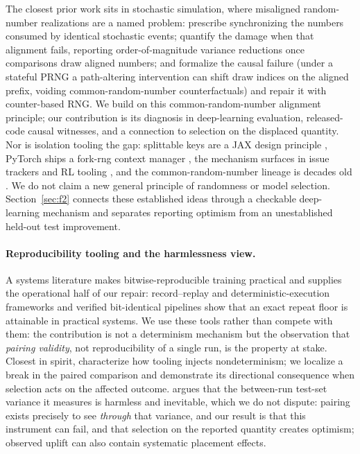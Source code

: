 The closest prior work sits in stochastic simulation, where misaligned
random-number realizations are a named problem: \citet{stout2008keeping}
prescribe synchronizing the numbers consumed by identical stochastic events;
\citet{klein2024noisefree} quantify the damage when that alignment fails,
reporting order-of-magnitude variance reductions once comparisons draw aligned
numbers; and \citet{buffalo2026realizing} formalize the causal failure (under a
stateful PRNG a path-altering intervention can shift draw indices on the aligned prefix,
voiding common-random-number counterfactuals) and repair it with counter-based
RNG. We build on this common-random-number alignment principle; our
contribution is its diagnosis in deep-learning evaluation, released-code
causal witnesses, and a connection to selection on the displaced quantity.
Nor is isolation tooling the gap:
splittable keys are a JAX design principle \citep{jax2018prng}, PyTorch ships a
fork-rng context manager \citep{pytorch_forkrng}, the mechanism surfaces in
issue trackers \citep{lightning2022rngissue} and RL tooling
\citep{matlab_rlevaluator}, and the common-random-number lineage is decades old
\citep{glasserman1992crn,pearce2022bayesian}. We do not claim a new general
principle of randomness or model selection. Section~\ref{sec:f2} connects
these established ideas through a checkable deep-learning mechanism and
separates reporting optimism from an unestablished held-out test improvement.

\paragraph{Reproducibility tooling and the harmlessness view.}
A systems literature makes bitwise-reproducible training practical and supplies
the operational half of our repair: record--replay and deterministic-execution
frameworks \citep{chen2022reproducible,heumos2023mlfcore} and verified
bit-identical pipelines \citep{shkolnikov2026bitidentical} show that an exact
repeat floor is attainable in practical systems. We use these tools rather
than compete with them: the contribution is not a determinism mechanism but the
observation that \emph{pairing validity}, not reproducibility of a single run,
is the property at stake. Closest in spirit,
\citet{zhuang2021randomness} characterize how tooling injects nondeterminism;
we localize a break in the paired comparison and demonstrate its directional
consequence when selection acts on the affected outcome.
\citet{jordan2024variance} argues that the between-run
test-set variance it measures is harmless and inevitable, which we do not dispute: pairing
exists precisely to see \emph{through} that variance, and our result is that
this instrument can fail, and that selection on the reported quantity creates
optimism; observed uplift can also contain systematic placement effects.


